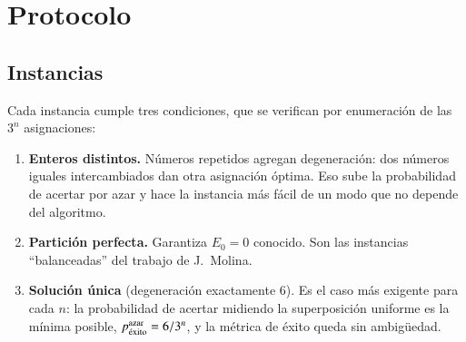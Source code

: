 \documentclass[11pt,a4paper]{article}
\newcommand{\pex}{p_{\rm \acute{e}xito}}
\begin{document}
\section{Protocolo}

\subsection{Instancias}

Cada instancia cumple tres condiciones, que se verifican por enumeración de las $3^n$
asignaciones:
\begin{enumerate}
\item \textbf{Enteros distintos.} Números repetidos agregan degeneración: dos números iguales
  intercambiados dan otra asignación óptima. Eso sube la probabilidad de acertar por azar y hace
  la instancia más fácil de un modo que no depende del algoritmo.
\item \textbf{Partición perfecta.} Garantiza $E_0=0$ conocido. Son las instancias ``balanceadas''
  del trabajo de J.~Molina.
\item \textbf{Solución única} (degeneración exactamente 6). Es el caso más exigente para cada $n$:
  la probabilidad de acertar midiendo la superposición uniforme es la mínima posible,
  $\pex^{\rm azar}=6/3^n$, y la métrica de éxito queda sin ambigüedad.
\end{enumerate}
\end{document}
